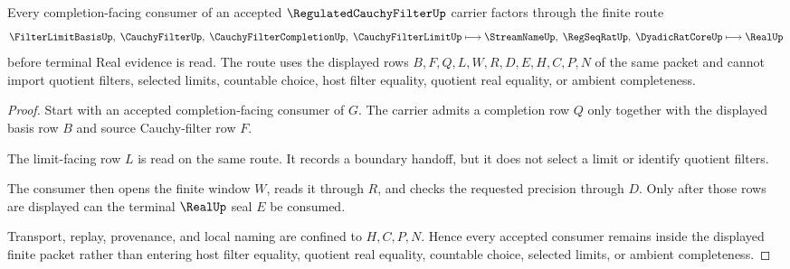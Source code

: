 \begin{theorem}
\label{thm:regulated-cauchy-filter-completion-route}
Every completion-facing consumer of an accepted $\RegulatedCauchyFilterUp$ carrier factors through the finite route
$$
\FilterLimitBasisUp,\;\CauchyFilterUp,\;\CauchyFilterCompletionUp,\;\CauchyFilterLimitUp
\longmapsto
\StreamNameUp,\;\RegSeqRatUp,\;\DyadicRatCoreUp
\longmapsto
\RealUp
$$
before terminal Real evidence is read. The route uses the displayed rows $B,F,Q,L,W,R,D,E,H,C,P,N$ of the same packet and cannot import quotient filters, selected limits, countable choice, host filter equality, quotient real equality, or ambient completeness.
\end{theorem}
\begin{proof}
Start with an accepted completion-facing consumer of $G$. The carrier admits a completion row $Q$ only together with the displayed basis row $B$ and source Cauchy-filter row $F$.

The limit-facing row $L$ is read on the same route. It records a boundary handoff, but it does not select a limit or identify quotient filters.

The consumer then opens the finite window $W$, reads it through $R$, and checks the requested precision through $D$. Only after those rows are displayed can the terminal $\RealUp$ seal $E$ be consumed.

Transport, replay, provenance, and local naming are confined to $H,C,P,N$. Hence every accepted consumer remains inside the displayed finite packet rather than entering host filter equality, quotient real equality, countable choice, selected limits, or ambient completeness.
\end{proof}


